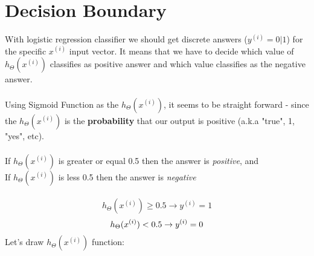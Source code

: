 \documentclass{article} %
\begin{document}
\section{Decision Boundary}
With logistic regression classifier we should get discrete answers ($y^{(i)}=0|1$) for the specific $x^{(i)}$ input vector. It means that we have to decide which value of $h_{\Theta}(x^{(i)})$ classifies as positive answer and which value classifies as the negative answer.\\
\\
Using Sigmoid Function as the $h_{\Theta}(x^{(i)})$, it seems to be straight forward - since the $h_{\Theta}(x^{(i)})$ is the \textbf{probability} that our output is positive (a.k.a "true", 1, "yes", etc).\\
\\
If  $h_{\Theta}(x^{(i)})$ is greater or equal 0.5 then the answer is \textit{positive}, and\\
If  $h_{\Theta}(x^{(i)})$ is less 0.5 then the answer is \textit{negative}\\
\\
\begin{equation}
h_\Theta(x^{(i)}) \geq 0.5 \rightarrow y^{(i)} = 1
\end{equation}
\begin{equation}
h_\Theta(x^{(i)}) < 0.5 \rightarrow y^{(i)} = 0\\
\end{equation}
Let's draw $h_\Theta(x^{(i)})$ function:
\begin{center}
\end{center}
\end{document}
